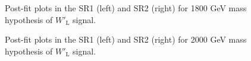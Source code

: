 \begin{figure}[H]
  \centering
  \caption{Post-fit plots in the SR1 (left) and SR2 (right) for 1800 GeV mass hypothesis of $W'_{\text{L}}$ signal.}
  \label{fig:Postfit_WpLH1800_Asimov}
\end{figure}
\begin{figure}[H]
  \centering
  \caption{Post-fit plots in the SR1 (left) and SR2 (right) for 2000 GeV mass hypothesis of $W'_{\text{L}}$ signal.}
  \label{fig:Postfit_WpLH2000_Asimov}
\end{figure}
